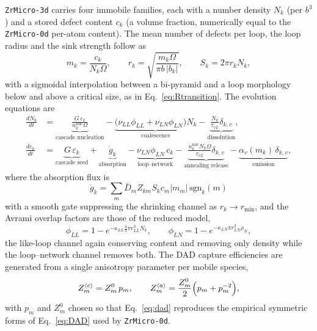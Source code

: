 \documentclass{article}
\newcommand{\aloop}{\ensuremath{\langle a\rangle}}
\newcommand{\cloop}{\ensuremath{\langle c\rangle}}
\newcommand{\ZrM}{\texttt{ZrMicro-3d}}
\newcommand{\ZrOd}{\texttt{ZrMicro-0d}}
\begin{document}
{\ZrM} carries four immobile families, each with a number density $N_k$ (per
$b^3$) and a stored defect content $c_k$ (a volume fraction, numerically equal to
the {\ZrOd} per-atom content). The mean number of defects per loop, the loop
radius and the sink strength follow as
\begin{equation}
m_k = \frac{c_k}{N_k \Omega},
\qquad
r_k = \sqrt{\frac{m_k \Omega}{\pi b\,|b_k|}},
\qquad
S_k = 2\pi r_k N_k ,
\label{eq:geometry}
\end{equation}
with a sigmoidal interpolation between a bi-pyramid and a loop morphology below
and above a critical size, as in Eq.~\eqref{eq:Rtransition}. The evolution
equations are
\begin{align}
\frac{dN_k}{dt} &=
\underbrace{\frac{G\,\varepsilon_k}{n^{\text{nuc}}_k \Omega}}_{\text{cascade nucleation}}
- \underbrace{\bigl(\nu_{LL}\phi_{LL} + \nu_{LN}\phi_{LN}\bigr) N_k}_{\text{coalescence}}
- \underbrace{\frac{N_k}{\tau_{vL}}\delta_{k,v}}_{\text{dissolution}} ,
\label{eq:dNdt}\\[1mm]
\frac{dc_k}{dt} &=
\underbrace{G\,\varepsilon_k}_{\text{cascade seed}}
+ \underbrace{\dot{g}_k}_{\text{absorption}}
- \underbrace{\nu_{LN}\phi_{LN}\,c_k}_{\text{loop--network}}
- \underbrace{\frac{n^{\text{nuc}}_k N_k \Omega}{\tau_{vL}}\delta_{k,v}}_{\text{annealing release}}
- \underbrace{\alpha_v(m_k)\,\delta_{k,v}}_{\text{emission}} ,
\label{eq:dcdt}
\end{align}
where the absorption flux is
\begin{equation}
\dot{g}_k = \sum_m \bar{D}_m Z_{km} S_k c_m |m_m| \,\mathrm{sgn}_k(m)
\label{eq:gdot}
\end{equation}
with a smooth gate suppressing the shrinking channel as $r_k \to r_{\min}$, and
the Avrami overlap factors are those of the reduced model,
\begin{equation}
\phi_{LL} = 1 - e^{-\kappa_{LL}\frac{4}{3}\pi r_{LL}^3 N_k},
\qquad
\phi_{LN} = 1 - e^{-\kappa_{LN}\pi r_{LN}^2 \rho_N},
\label{eq:avrami}
\end{equation}
the like-loop channel again conserving content and removing only density while the
loop--network channel removes both. The DAD capture efficiencies are generated from
a single anisotropy parameter per mobile species,
\begin{equation}
Z^{\cloop}_m = Z^0_m\,p_m ,
\qquad
Z^{\aloop}_m = \frac{Z^0_m}{2}\Bigl(p_m + p_m^{-2}\Bigr),
\label{eq:dad}
\end{equation}
with $p_m$ and $Z^0_m$ chosen so that Eq.~\eqref{eq:dad} reproduces the empirical
symmetric forms of Eq.~\eqref{eq:DAD} used by {\ZrOd}.
\end{document}
